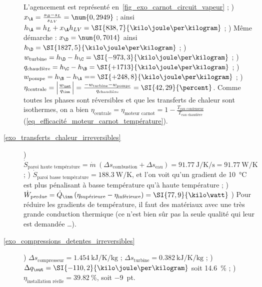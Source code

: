 \begin{description}
						\tab L’agencement est représenté en~\cref{fig_exo_carnot_circuit_vapeur} ;
						\tab{}) $x_\A = \frac{s_\B - s_L}{s_{LV}} = \num{0,2949}$ ; ainsi $h_\A = h_L + x_\A h_{LV} = \SI{838,7}{\kilo\joule\per\kilogram}$ ;
						) Même démarche : $x_\D = \num{0,7014}$ ainsi $h_\D = \SI{1827,5}{\kilo\joule\per\kilogram}$ ;
						) $w_\text{turbine} = h_\D - h_\C = \SI{-973,3}{\kilo\joule\per\kilogram}$ ;
						) $q_\text{chaudière} = h_\C - h_\B = \SI{+1713}{\kilo\joule\per\kilogram}$ ;
						) $w_\text{pompe} = h_\B - h_\A =  = \SI{+248,8}{\kilo\joule\per\kilogram}$ ;
						) $\eta_\text{centrale} = \left|\frac{w_\net}{q_\inn}\right| = \frac{-w_\text{turbine} - w_\text{pompe}}{q_\text{chaudière}} = \SI{42,29}{\percent}$. Comme toutes les phases sont réversibles et que les transferts de chaleur sont isothermes, on a bien $\eta_\text{centrale} = \eta_\text{moteur carnot} = 1 - \frac{T_\text{eau condenseur}}{T_\text{eau chaudière}}$ (\ref{eq_efficacité_moteur_carnot_température}).
		\item [\ref{exo_transferts_chaleur_irreversibles}]
						) $\dot{S}_\text{paroi haute température} = \dot{m} \ (\Delta s_\text{combustion} + \Delta s_\text{eau}) = \SI[per-mode = symbol]{+91,77}{\joule\per\kelvin\per\second} = \SI{+91,77}{\watt\per\kelvin}$ ;
						) $\dot{S}_\text{paroi basse\ température} = \SI{+188,3}{\watt\per\kelvin}$, et l’on voit qu’un gradient de \SI{10}{\degreeCelsius} est plus pénalisant à basse température qu’à haute température ;
						) $\dot{W}_\text{perdue} = \dot Q_\inn \left(\eta_\text{supérieure} - \eta_\text{inférieure}\right) = \SI{77,9}{\kilo\watt}$
						) Pour réduire les gradients de température, il faut des matériaux avec une très grande conduction thermique (ce n’est bien sûr pas la seule qualité qui leur est demandée …).
		\item [\ref{exo_compressions_detentes_irreversibles}]
						) $\Delta s_\text{compresseur} = \SI{+1,454}{\kilo\joule\per\kelvin\per\kilogram}$ ; $\Delta s_\text{turbine} = \SI{+0,382}{\kilo\joule\per\kelvin\per\kilogram}$ ;
						) $\Delta q_\out = \SI{-110,2}{\kilo\joule\per\kilogram}$ soit \SI{+14,6}{\percent} ;
						) $\eta_\text{installation réelle} =\SI{39,82}{\percent}$, soit \SI{-9}{pt}.
	\end{description}
